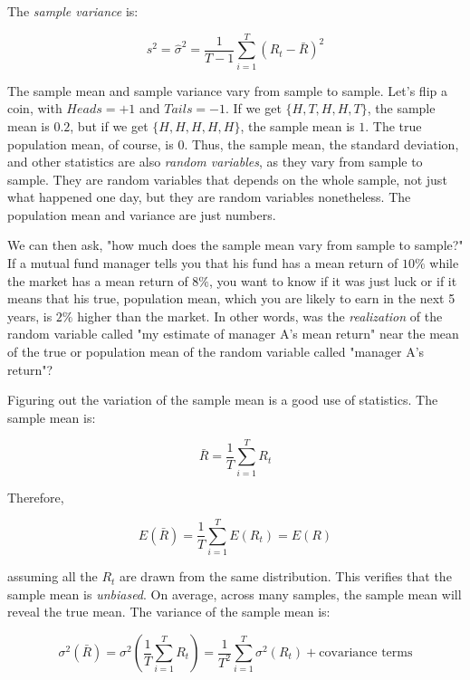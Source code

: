 The \textit{sample variance} is:

\begin{equation}
    s^2 = \hat{\sigma}^2 = \frac{1}{T - 1}\sum_{i=1}^T (R_t - \bar{R})^2
\end{equation}

The sample mean and sample variance vary from sample to sample.
Let's flip a coin, with $Heads = +1$ and $Tails = -1$.
If we get $\{H, T, H, H, T\}$, the sample mean is 
$0.2$, but if we get $\{H, H, H, H, H\}$, the sample mean is $1$.
The true population mean, of course, is $0$.
Thus, the sample mean, the standard deviation, and other 
statistics are also \textit{random variables}, as 
they vary from sample to sample.
They are random variables that depends on the whole sample, 
not just what happened one day, but they are random variables
nonetheless. The population mean and variance are just 
numbers. 

We can then ask, "how much does the sample mean vary from
sample to sample?" If a mutual fund manager tells you
that his fund has a mean return of $10\%$ while the 
market has a mean return of $8\%$, you want to know 
if it was just luck or if it means that his true,
population mean, which you are likely to earn in the 
next 5 years, is $2\%$ higher than the market.
In other words, was the \textit{realization} of the
random variable called "my estimate of manager A's 
mean return" near the mean of the true or population mean
of the random variable called "manager A's return"?

Figuring out the variation of the sample mean is 
a good use of statistics. The sample mean is:

\begin{equation}
    \bar{R} = \frac{1}{T}\sum_{i=1}^T R_t
\end{equation}

Therefore,

\begin{equation}
    E(\bar{R}) = \frac{1}{T}\sum_{i=1}^T E(R_t) = E(R)
\end{equation}

assuming all the $R_t$ are drawn from the same distribution.
This verifies that the sample mean is \textit{unbiased}.
On average, across many samples, the sample mean 
will reveal the true mean. The variance of the sample mean is:

\begin{equation}
    \sigma^2(\bar{R}) = \sigma^2(\frac{1}{T}\sum_{i=1}^T R_t) 
    = \frac{1}{T^2}\sum_{i=1}^T \sigma^2(R_t) + \text{covariance terms}
\end{equation}

